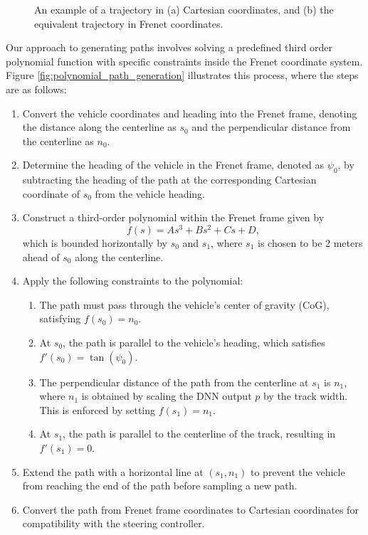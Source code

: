 \begin{figure}[htb!]
    \centering
    
    \caption[An example of a trajectory in Cartestian and Frenet coordinates]{An example of a trajectory in (a) Cartesian coordinates, and (b) the equivalent trajectory in Frenet coordinates.}
    \label{fig:frenet_frame}
\end{figure}


Our approach to generating paths involves solving a predefined third order polynomial function with specific constraints inside the Frenet coordinate system.
Figure \ref{fig:polynomial_path_generation} illustrates this process, where the steps are as follows: 

\begin{enumerate}
    \item Convert the vehicle coordinates and heading into the Frenet frame, denoting the distance along the centerline as $s_0$ and the perpendicular distance from the centerline as $n_0$.
    \item Determine the heading of the vehicle in the Frenet frame, denoted as $\psi_0$, by subtracting the heading of the path at the corresponding Cartesian coordinate of $s_0$ from the vehicle heading.
    \item Construct a third-order polynomial within the Frenet frame given by
        \begin{equation}
        f(s) = As^3 + Bs^2 + Cs + D,
        \end{equation}
    which is bounded horizontally by $s_0$ and $s_1$, where $s_1$ is chosen to be 2 meters ahead of $s_0$ along the centerline.
    \item Apply the following constraints to the polynomial:
    \begin{enumerate}
        \item The path must pass through the vehicle's center of gravity (CoG), satisfying $f(s_0) = n_0$.
        \item At $s_0$, the path is parallel to the vehicle's heading, which satisfies $f'(s_0) = \tan(\psi_0)$.
        \item The perpendicular distance of the path from the centerline at $s_1$ is $n_1$, where $n_1$ is obtained by scaling the DNN output $p$ by the track width.
        This is enforced by setting $f(s_1) = n_1$.
        \item At $s_1$, the path is parallel to the centerline of the track, resulting in $f'(s_1) = 0$.
    \end{enumerate}
    \item Extend the path with a horizontal line at $(s_1,n_1)$ to prevent the vehicle from reaching the end of the path before sampling a new path.
    \item Convert the path from Frenet frame coordinates to Cartesian coordinates for compatibility with the steering controller.
\end{enumerate}


